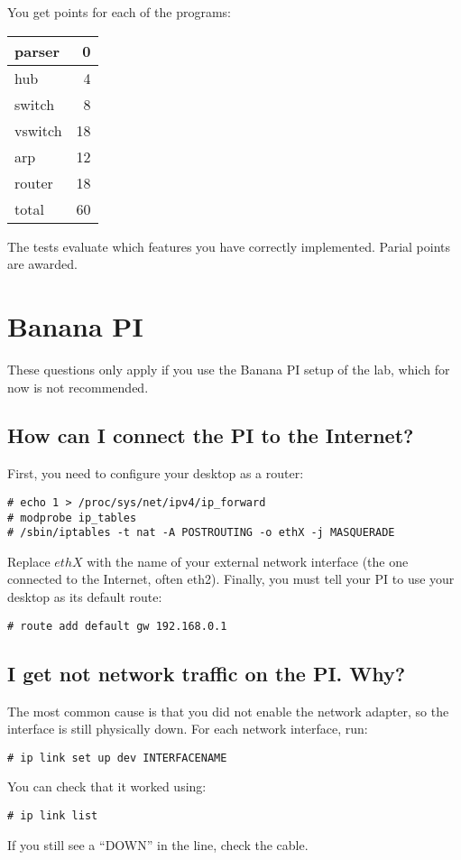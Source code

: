 \documentclass{article}
\begin{document}
You get points for each of the programs:
\begin{center}
\begin{tabular}{l|r}
parser &  0 \\ \hline
hub    &  4 \\ \hline
switch &  8 \\ \hline
vswitch& 18 \\ \hline
arp    & 12 \\ \hline
router & 18 \\ \hline \hline
total  & 60 \\
\end{tabular}
\end{center}
The tests evaluate which features you have correctly implemented.
Parial points are awarded.



\section{Banana PI}

These questions only apply if you use the Banana PI setup of the lab,
which for now is not recommended.

\subsection{How can I connect the PI to the Internet?}

First, you need to configure your desktop as a router:
\begin{verbatim}
# echo 1 > /proc/sys/net/ipv4/ip_forward
# modprobe ip_tables
# /sbin/iptables -t nat -A POSTROUTING -o ethX -j MASQUERADE
\end{verbatim}
Replace $ethX$ with the name of your external network interface
(the one connected to the Internet, often eth2).  Finally, you
must tell your PI to use your desktop as its default route:
\begin{verbatim}
# route add default gw 192.168.0.1
\end{verbatim}


\subsection{I get not network traffic on the PI. Why?}

The most common cause is that you did not enable the network adapter,
so the interface is still physically down. For each network interface,
run:
\begin{verbatim}
# ip link set up dev INTERFACENAME
\end{verbatim}
You can check that it worked using:
\begin{verbatim}
# ip link list
\end{verbatim}
If you still see a ``DOWN'' in the line, check the cable.
\end{document}
